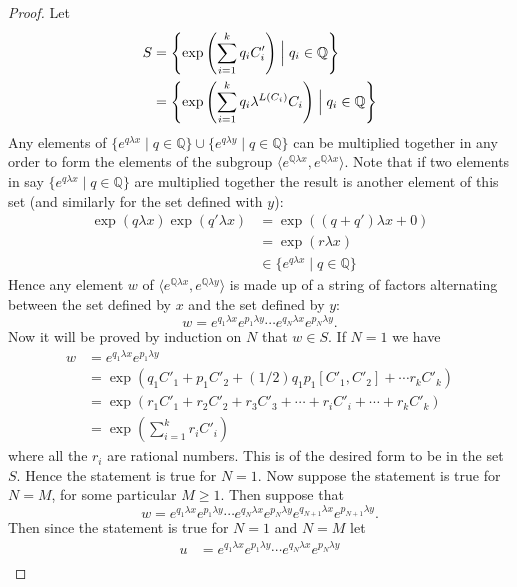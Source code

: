 \documentclass[honours]{UNSWthesis}
\newcommand{\Q}{\mathbb{Q}}
\newcommand{\1}{\mathbf{e}_{1}}
\newcommand{\2}{\mathbf{e}_{3}}
\newcommand{\3}{\mathbf{e}_{3}}
\begin{document}
\begin{proof}
Let 
\begin{align*}
S&=\left\lbrace \exp \left(\sum\limits_{i=1}^{k}q_{i}C'_{i}\right) \Bigm| q_{i} \in \Q \right\rbrace \\
&=\left\lbrace \exp \left(\sum\limits_{i=1}^{k}q_{i}\lambda^{L(C_{i})}C_{i}\right) \Bigm| q_{i} \in \Q \right\rbrace
\end{align*}
Any elements of $\{ e^{q\lambda x} \mid q \in \Q \}\cup \{ e^{q\lambda y} \mid q \in \Q \}$ can be multiplied together in any order to form the elements of the subgroup $\langle e^{\Q\lambda x},e^{\Q\lambda x} \rangle$. Note that if two elements in say $\{ e^{q\lambda x} \mid q \in \Q \}$ are multiplied together the result is another element of this set (and similarly for the set defined with $y$):
\begin{align*}
\exp(q \lambda x)\exp(q' \lambda x)&=\exp((q+q')\lambda x +0) \\
&=\exp(r\lambda x) \\
&\in \{ e^{q\lambda x} \mid q \in \Q \}
\end{align*}
Hence any element $w$ of $\langle e^{\Q\lambda x},e^{\Q\lambda y} \rangle$ is made up of a string of factors alternating between the set defined by $x$ and the set defined by $y$:
\[
w=e^{q_{1}\lambda x}e^{p_{1}\lambda y} \cdots e^{q_{N}\lambda x}e^{p_{N}\lambda y}.
\]
Now it will be proved by induction on $N$ that $w \in S$. \newline
If $N=1$ we have 
\begin{align*}
w &=e^{q_{1}\lambda x}e^{p_{1}\lambda y} \\
&= \exp \left( q_{1}C'_{1}+p_{1}C'_{2} +(1/2)q_{1}p_{1}[C'_{1},C'_{2}]+\cdots r_{k} C'_{k} \right) \\
&= \exp \left( r_{1}C'_{1}+r_{2}C'_{2} +r_{3}C'_{3}+\cdots+r_{i} C'_{i}+\cdots + r_{k}C'_{k} \right) \\
&=\exp \left(\sum\limits_{i=1}^{k}r_{i}C'_{i}\right)
\end{align*}
where all the $r_{i}$ are rational numbers.
This is of the desired form to be in the set $S$. Hence the statement is true for $N=1$. \newline
Now suppose the statement is true for $N=M$, for some particular $M \geq 1$. Then suppose that
\[
w=e^{q_{1}\lambda x}e^{p_{1}\lambda y} \cdots e^{q_{N}\lambda x}e^{p_{N}\lambda y}e^{q_{N+1}\lambda x}e^{p_{N+1}\lambda y}.
\]
Then since the statement is true for $N=1$ and $N=M$ let 
\begin{align*}
u&=e^{q_{1}\lambda x}e^{p_{1}\lambda y} \cdots e^{q_{N}\lambda x}e^{p_{N}\lambda y} \\

\end{align*}
\end{proof}
\end{document}
